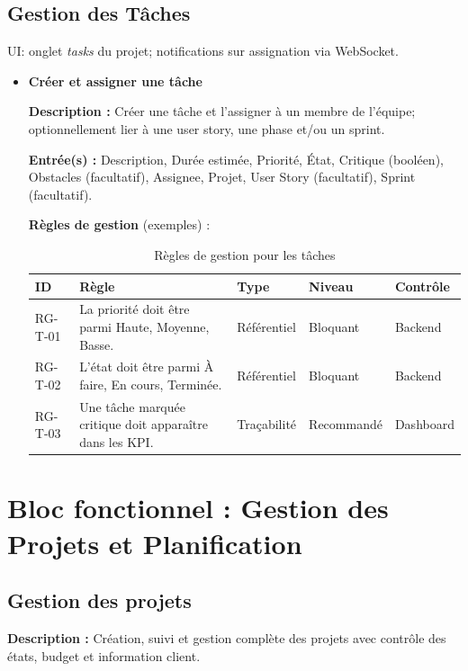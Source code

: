 \subsection{Gestion des Tâches}
UI: onglet \textit{tasks} du projet; notifications sur assignation via WebSocket.
\begin{itemize}
  \item \textbf{Créer et assigner une tâche}
  
  \textbf{Description :} Créer une tâche et l’assigner à un membre de l’équipe; optionnellement lier à une user story, une phase et/ou un sprint.
  
  \textbf{Entrée(s) :} Description, Durée estimée, Priorité, État, Critique (booléen), Obstacles (facultatif), Assignee, Projet, User Story (facultatif), Sprint (facultatif).
  
  \textbf{Règles de gestion} (exemples) :
  \begin{table}[H]
    \centering
    \small
    \begin{tabular}{|l|p{6cm}|l|l|l|}
      \hline
      \textbf{ID} & \textbf{Règle} & \textbf{Type} & \textbf{Niveau} & \textbf{Contrôle} \\
      \hline
      RG-T-01 & La priorité doit être parmi {Haute, Moyenne, Basse}. & Référentiel & Bloquant & Backend \\
      \hline
      RG-T-02 & L’état doit être parmi {À faire, En cours, Terminée}. & Référentiel & Bloquant & Backend \\
      \hline
      RG-T-03 & Une tâche marquée critique doit apparaître dans les KPI. & Traçabilité & Recommandé & Dashboard \\
      \hline
    \end{tabular}
    \caption{Règles de gestion pour les tâches}
  \end{table}
\end{itemize}


\section{Bloc fonctionnel : Gestion des Projets et Planification}

\subsection{Gestion des projets}
\textbf{Description :} Création, suivi et gestion complète des projets avec contrôle des états, budget et information client.

